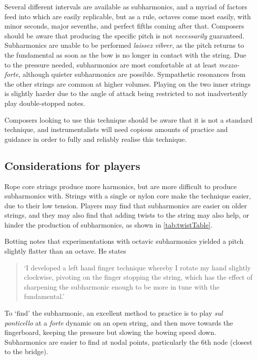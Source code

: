 Several different intervals are available as subharmonics, and a myriad of factors feed into which are easily replicable, but as a rule, octaves come most easily, with minor seconds, major sevenths, and perfect fifths coming after that.
Composers should be aware that producing the specific pitch is not \emph{necessarily} guaranteed.
Subharmonics are unable to be performed \emph{laissez vibrer}, as the pitch returns to the fundamental as soon as the bow is no longer in contact with the string.\autocite[]{appleseedFeedbackExploratorySession2019}
Due to the pressure needed, subharmonics are most comfortable at at least \emph{mezzo-forte}, although quieter subharmonics are possible. 
Sympathetic resonances from the other strings are common at higher volumes.
Playing on the two inner strings is slightly harder due to the angle of attack being restricted to not inadvertently play double-stopped notes.\autocite[99]{welbanksFoundationsModernCello}



Composers looking to use this technique should be aware that it is not a standard technique, and instrumentalists will need copious amounts of practice and guidance in order to fully and reliably realise this technique.

\subsection{Considerations for players}
Rope core strings produce more harmonics, but are more difficult to produce subharmonics with.
Strings with a single or nylon core make the technique easier, due to their low tension.\autocite[99]{welbanksFoundationsModernCello}
Players may find that subharmonics are easier on older strings, and they may also find that adding twists to the string may also help, or hinder the production of subharmonics, as shown in \autoref{tab:twistTable}.\autocite[]{kimuraHowProduceSubharmonics1999}


Botting notes that experimentations with octavic subharmonics yielded a pitch slightly flatter than an octave. He states \begin{quotation}
  `I developed a left hand finger technique whereby I rotate my hand slightly clockwise, pivoting on the finger stopping the string, which has the effect of sharpening the subharmonic enough to be more in tune with the fundamental.'\autocite[111]{bottingDevelopingPersonalVocabulary2019}
\end{quotation}

To `find' the subharmonic, an excellent method to practice is to play \emph{sul ponticello} at a \emph{forte} dynamic on an open string, and then move towards the fingerboard, keeping the pressure but slowing the bowing speed down.
Subharmonics are easier to find at nodal points, particularly the 6th node (closest to the bridge).\autocite[]{appleseedFeedbackSightreadingSession2019}

